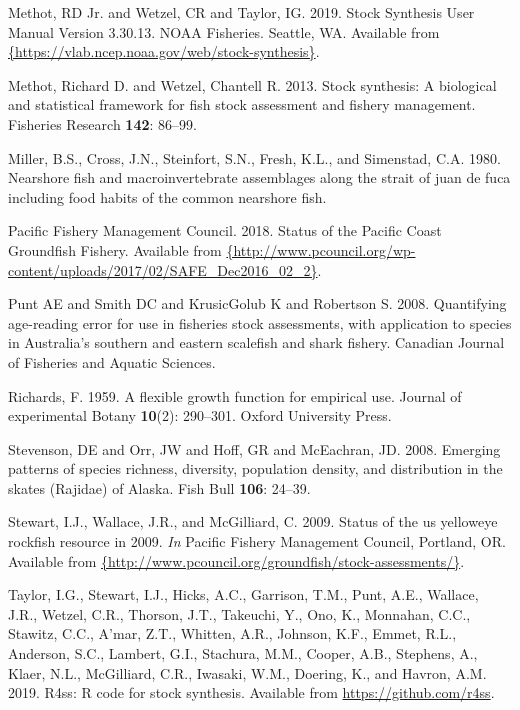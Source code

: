 \documentclass[12pt,]{article}
\begin{document}
\leavevmode\hypertarget{ref-Methot2019}{}%
Methot, RD Jr. and Wetzel, CR and Taylor, IG. 2019. Stock Synthesis User
Manual Version 3.30.13. NOAA Fisheries. Seattle, WA. Available from
\href{\%7Bhttps://vlab.ncep.noaa.gov/web/stock-synthesis\%7D}{\{https://vlab.ncep.noaa.gov/web/stock-synthesis\}}.

\leavevmode\hypertarget{ref-Methot2013}{}%
Methot, Richard D. and Wetzel, Chantell R. 2013. Stock synthesis: A
biological and statistical framework for fish stock assessment and
fishery management. Fisheries Research \textbf{142}: 86--99.

\leavevmode\hypertarget{ref-Miller1980}{}%
Miller, B.S., Cross, J.N., Steinfort, S.N., Fresh, K.L., and Simenstad,
C.A. 1980. Nearshore fish and macroinvertebrate assemblages along the
strait of juan de fuca including food habits of the common nearshore
fish.

\leavevmode\hypertarget{ref-PFMC2018}{}%
Pacific Fishery Management Council. 2018. Status of the Pacific Coast
Groundfish Fishery. Available from
\href{\%7Bhttp://www.pcouncil.org/wp-content/uploads/2017/02/SAFE_Dec2016_02_2\%7D}{\{http://www.pcouncil.org/wp-content/uploads/2017/02/SAFE\_Dec2016\_02\_2\}}.

\leavevmode\hypertarget{ref-Punt2008}{}%
Punt AE and Smith DC and KrusicGolub K and Robertson S. 2008.
Quantifying age-reading error for use in fisheries stock assessments,
with application to species in Australia's southern and eastern
scalefish and shark fishery. Canadian Journal of Fisheries and Aquatic
Sciences.

\leavevmode\hypertarget{ref-richards1959flexible}{}%
Richards, F. 1959. A flexible growth function for empirical use. Journal
of experimental Botany \textbf{10}(2): 290--301. Oxford University
Press.

\leavevmode\hypertarget{ref-Stevenson2008}{}%
Stevenson, DE and Orr, JW and Hoff, GR and McEachran, JD. 2008. Emerging
patterns of species richness, diversity, population density, and
distribution in the skates (Rajidae) of Alaska. Fish Bull \textbf{106}:
24--39.

\leavevmode\hypertarget{ref-Stewart2009}{}%
Stewart, I.J., Wallace, J.R., and McGilliard, C. 2009. Status of the us
yelloweye rockfish resource in 2009. \emph{In} Pacific Fishery
Management Council, Portland, OR. Available from
\href{\%7Bhttp://www.pcouncil.org/groundfish/stock-assessments/\%7D}{\{http://www.pcouncil.org/groundfish/stock-assessments/\}}.

\leavevmode\hypertarget{ref-Taylor2019}{}%
Taylor, I.G., Stewart, I.J., Hicks, A.C., Garrison, T.M., Punt, A.E.,
Wallace, J.R., Wetzel, C.R., Thorson, J.T., Takeuchi, Y., Ono, K.,
Monnahan, C.C., Stawitz, C.C., A'mar, Z.T., Whitten, A.R., Johnson,
K.F., Emmet, R.L., Anderson, S.C., Lambert, G.I., Stachura, M.M.,
Cooper, A.B., Stephens, A., Klaer, N.L., McGilliard, C.R., Iwasaki,
W.M., Doering, K., and Havron, A.M. 2019. R4ss: R code for stock
synthesis. Available from \url{https://github.com/r4ss}.
\end{document}

